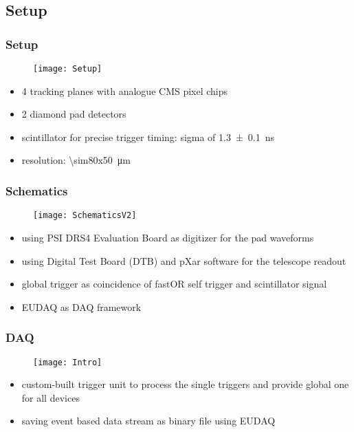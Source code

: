 \subsection{Setup}
\begin{frame}
	\frametitle{Setup}
	\begin{figure}
		\centering
		\texttt{[image: Setup]}
	\end{figure}
	\begin{itemize}
		\setlength{\itemsep}{\fill}
		\item 4 tracking planes with analogue CMS pixel chips
		\item 2 diamond pad detectors
		\item scintillator for precise trigger timing: sigma of \SI{1.3\pm.1}{ns}
		\item resolution: \SI{\sim80x50}{\micro\meter}
	\end{itemize}
\end{frame}
\begin{frame}
	\frametitle{Schematics}
	\begin{figure}
		\centering
		\texttt{[image: SchematicsV2]}
	\end{figure}
	\begin{itemize}
		\setlength{\itemsep}{\fill}
		\item using PSI DRS4 Evaluation Board as digitizer for the pad waveforms
		\item using Digital Test Board (DTB) and pXar software for the telescope readout
		\item global trigger as coincidence of fastOR self trigger and scintillator signal
		\item EUDAQ as DAQ framework
	\end{itemize}
\end{frame}
\begin{frame}
	\frametitle{DAQ}
	\begin{figure}
		\centering
		\texttt{[image: Intro]}
	\end{figure}
	\begin{itemize}
		\item custom-built trigger unit to process the single triggers and provide global one for all devices
		\item saving event based data stream as binary file using EUDAQ
	\end{itemize}
\end{frame}
